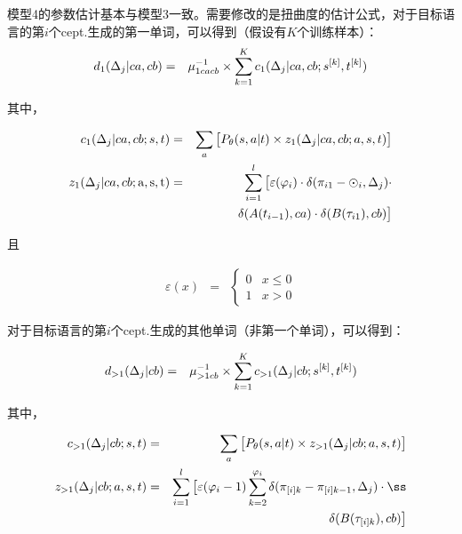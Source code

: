 \begin{appendices}
\parinterval 模型4的参数估计基本与模型3一致。需要修改的是扭曲度的估计公式，对于目标语言的第$i$个cept.生成的第一单词，可以得到（假设有$K$个训练样本）：
\begin{eqnarray}
d_1(\Delta_j|ca,cb) &=& \mu_{1cacb}^{-1} \times \sum_{k=1}^{K}c_1(\Delta_j|ca,cb;{s}^{[k]},{t}^{[k]})
\label{eq:1.15}
\end{eqnarray}

其中，

\begin{eqnarray}
c_1(\Delta_j|ca,cb;{s},{t})           & = & \sum_{{a}}\big[{P}_{\theta}({s},{a}|{t}) \times z_1(\Delta_j|ca,cb;{a},{s},{t})\big] \label{eq:1.16} \\
z_1(\Delta_j|ca,cb;\rm{a},{s},{t}) & = & \sum_{i=1}^l \big[\varepsilon(\varphi_i) \cdot \delta(\pi_{i1}-\odot _{i},\Delta_j) \cdot \nonumber \\
                                                                           &     & \delta(A(t_{i-1}),ca) \cdot \delta(B(\tau_{i1}),cb) \big] \label{eq:1.17}
\end{eqnarray}

且

\begin{eqnarray}
\varepsilon(x) &=& \begin{cases}
0 & x \leq 0 \\
1 & x > 0
\end{cases}
\label{eq:1.21}
\end{eqnarray}

对于目标语言的第$i$个cept.生成的其他单词（非第一个单词），可以得到：

\begin{eqnarray}
d_{>1}(\Delta_j|cb) &=& \mu_{>1cb}^{-1} \times \sum_{k=1}^{K}c_{>1}(\Delta_j|cb;{s}^{[k]},{t}^{[k]})
\label{eq:1.18}
\end{eqnarray}

其中，

\begin{eqnarray}
c_{>1}(\Delta_j|cb;\seq{s},\seq{t})                  & = & \sum_{\seq{a}}\big[\funp{P}_{\theta}(\seq{s},\seq{a}|\seq{t}) \times z_{>1}(\Delta_j|cb;\seq{a},\seq{s},\seq{t}) \big] \label{eq:1.19} \\
z_{>1}(\Delta_j|cb;\seq{a},\seq{s},\seq{t}) & = & \sum_{i=1}^l \big[\varepsilon(\varphi_i-1)\sum_{k=2}^{\varphi_i}\delta(\pi_{[i]k}-\pi_{[i]k-1},\Delta_j) \cdot \nonumber ß\\
                                                                                  &    & \delta(B(\tau_{[i]k}),cb) \big] \label{eq:1.20}
\end{eqnarray}


\end{appendices}
